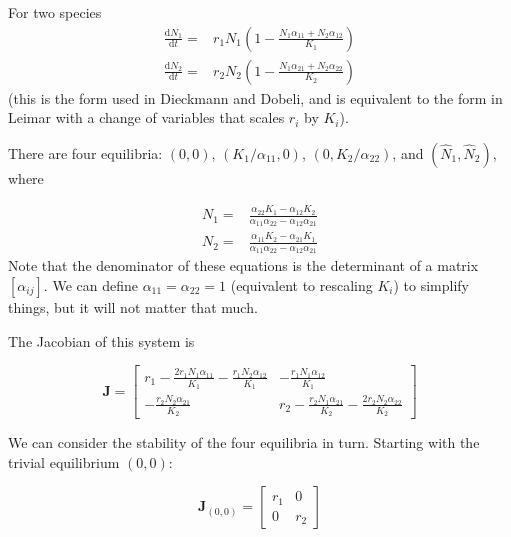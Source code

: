 \documentclass[12pt,a4paper]{article}
\newcommand{\ud}{\mathrm{d}}
\begin{document}
For two species
\begin{equation}
  \label{eq:competitive-lv}
  \begin{split}
    \frac{\ud N_1}{\ud t} = &r_1 N_1
    \left(1 - \frac{N_1 \alpha_{11} + N_2 \alpha_{12}}{K_1}\right)\\
    \frac{\ud N_2}{\ud t} = &r_2 N_2
    \left(1 - \frac{N_1 \alpha_{21} + N_2 \alpha_{22}}{K_2}\right)
  \end{split}
\end{equation}
(this is the form used in Dieckmann and Dobeli, and is equivalent to
the form in Leimar with a change of variables that scales $r_i$ by
$K_i$).

There are four equilibria: $(0,0)$, $(K_1 / \alpha_{11}, 0)$, 
$(0, K_2 / \alpha_{22})$, and $(\hat N_1, \hat N_2)$, where

\begin{equation*}
  \begin{split}
    N_1 =& \frac{\alpha_{22} K_1 - \alpha_{12}K_2}
    {\alpha_{11}\alpha_{22} - \alpha_{12}\alpha_{21}}\\
    N_2 =& \frac{\alpha_{11} K_2 - \alpha_{21}K_1}
    {\alpha_{11}\alpha_{22} - \alpha_{12}\alpha_{21}}
  \end{split}
\end{equation*}
Note that the denominator of these equations is the determinant of a
matrix $[\alpha_{ij}]$.  We can define $\alpha_{11} = \alpha_{22} = 1$
(equivalent to rescaling $K_i$) to simplify things, but it will not
matter that much.

The Jacobian of this system is

\begin{equation}
  \label{eq:competitive-lv-jac}
  \mathbf{J} =
  \begin{bmatrix}
    r_1 - \frac{2 r_1 N_1 \alpha_{11}}{K_1} -
    \frac{r_1 N_2 \alpha_{12}}{K_1}&
    -\frac{r_1N_1\alpha_{12}}{K_1}\\
    -\frac{r_2N_2\alpha_{21}}{K_2}&
    r_2 - \frac{r_2N_1\alpha_{21}}{K_2} - \frac{2r_2N_2\alpha_{22}}{K_2}
  \end{bmatrix}
\end{equation}

We can consider the stability of the four equilibria in turn.
Starting with the trivial equilibrium $(0,0)$:

\begin{equation}
  \label{eq:competitive-lv-jac-trivial}
  \mathbf{J}_{(0,0)} =
  \begin{bmatrix}
    r_1 & 0 \\
    0   & r_2
  \end{bmatrix}
\end{equation}
\end{document}

